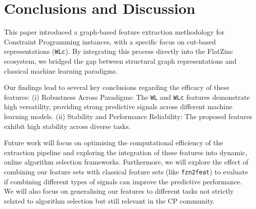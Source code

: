 \section{Conclusions and Discussion}
This paper introduced a graph-based feature extraction methodology for Constraint Programming instances, with a specific focus on cut-based representations (\texttt{WLc}). By integrating this process directly into the FlatZinc ecosystem, we bridged the gap between structural graph representations and classical machine learning paradigms.

Our findings lead to several key conclusions regarding the efficacy of these features:
(i) Robustness Across Paradigms: The \texttt{WL} and \texttt{WLc} features demonstrate high versatility, providing strong predictive signals across different machine learning models. (ii) Stability and Performance Reliability: The proposed features exhibit high stability across diverse tasks.

Future work will focus on optimising the computational efficiency of the extraction pipeline and exploring the integration of these features into dynamic, online algorithm selection frameworks. Furthermore, we will explore the effect of combining our feature sets with classical feature sets (like \texttt{fzn2feat}) to evaluate if combining different types of signals can improve the predictive performance. We will also focus on generalising our features to different tasks not strictly related to algorithm selection but still relevant in the CP community.
